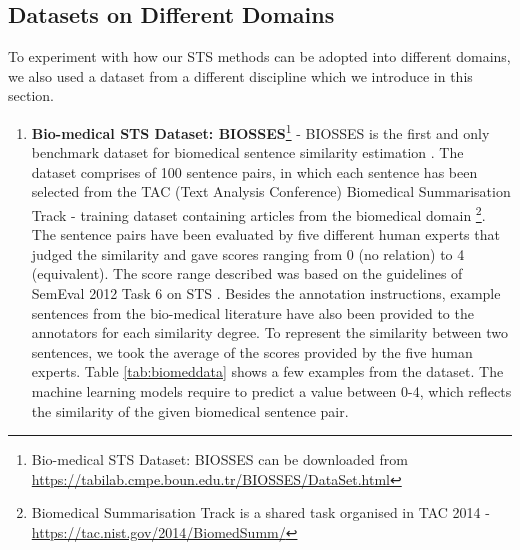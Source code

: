 \subsection{Datasets on Different Domains}
To experiment with how our STS methods can be adopted into different domains, we also used a dataset from a different discipline which we introduce in this section. 
\begin{enumerate}
	
	\item{ \textbf{Bio-medical STS Dataset: BIOSSES}\footnote{Bio-medical STS Dataset: BIOSSES  can be downloaded from \url{https://tabilab.cmpe.boun.edu.tr/BIOSSES/DataSet.html} }} - BIOSSES is the first and only benchmark dataset for biomedical sentence similarity estimation \autocite{10.1093/bioinformatics/btx238}. The dataset comprises of 100 sentence pairs, in which each sentence has been selected from the TAC (Text Analysis Conference) Biomedical Summarisation Track - training dataset containing articles from the biomedical domain \footnote{Biomedical Summarisation Track is a shared task organised in TAC 2014 - \url{https://tac.nist.gov/2014/BiomedSumm/}}. The sentence pairs have been evaluated by five different human experts that judged the similarity and gave scores ranging from 0 (no relation) to 4 (equivalent). The score range described was based on the guidelines of SemEval 2012 Task 6 on STS \autocite{agirre-etal-2012-semeval}. Besides the annotation instructions, example sentences from the bio-medical literature have also been provided to the annotators for each similarity degree. To represent the similarity between two sentences, we took the average of the scores provided by the five human experts. Table \ref{tab:biomeddata} shows a few examples from the dataset. The machine learning models require to predict a value between 0-4, which reflects the similarity of the given biomedical sentence pair.
	


\end{enumerate}
